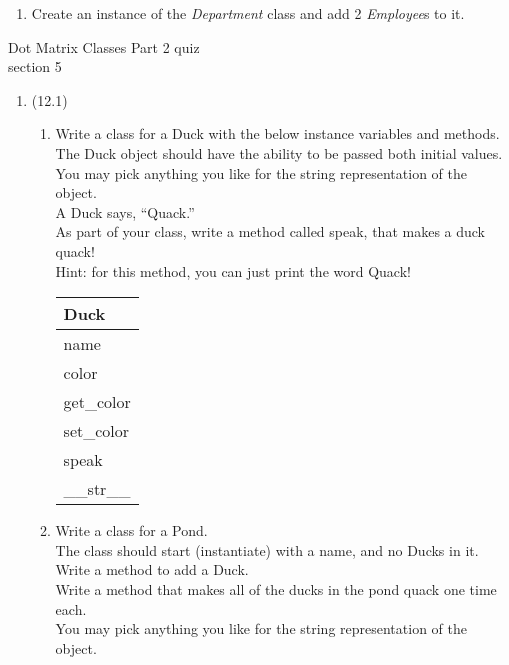 \documentclass{article}
\begin{document}
\begin{enumerate}
\begin{enumerate}
		\item
			Create an instance of the \textit{Department} class and add 2 \textit{Employee}s to it.
	\end{enumerate}
\pagebreak


\end{enumerate}
\pagebreak
Dot Matrix \hfill Classes Part 2 quiz\\
section 5\\
\begin{enumerate}
\item (12.1)
	\begin{enumerate}
		\item
			Write a class for a Duck with the below instance variables and methods. \\ 
			The Duck object should have the ability to be passed both initial values.\\  
			You may pick anything you like for the string representation of the object.\\
			A Duck says, ``Quack.''\\  
			As part of your class, write a method called speak, that makes a duck quack!\\
			Hint: for this method, you can just print the word Quack!
			\begin{flushright}
			\begin{tabular}{|l|}
				\hline
				Duck\\ \hline
				name\\	color\\	 \hline
				get\_color \\ set\_color \\ speak \\ \_\_str\_\_ \\ \hline
			\end{tabular}
			\end{flushright}

		\item
			Write a class for a Pond. \\
			The class should start (instantiate) with a name, and no Ducks in it. \\ 
			Write a method to add a Duck.\\
			Write a method that makes all of the ducks in the pond quack one time each.\\
			You may pick anything you like for the string representation of the object.
	

\end{enumerate}
\end{enumerate}
\end{document}
